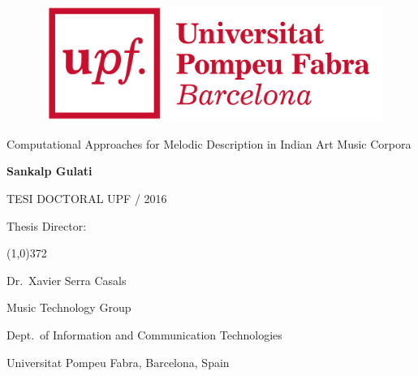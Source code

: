 
\newpage
\thispagestyle{empty}
\begin{titlingpage}
\begin{flushright}

  \begin{figure}[t]
    \begin{flushright}
	\includegraphics[scale=0.08]{ch00/figures/logo_upf_color.png}
    \end{flushright}
  \end{figure}

  \vspace*{2cm} 


  {\linespread{1.1} \huge \textsf{Computational Approaches for Melodic Description in Indian Art Music Corpora} \par}
  
  \vspace*{2.5cm}

  \textbf{\large {Sankalp Gulati}}
  
  \vspace*{\fill} 
  TESI DOCTORAL UPF / 2016

\end{flushright}
  
  \vspace*{2cm}

  Thesis Director:

  \vspace*{-0.25cm}

  \line(1,0){372}
  
  \vspace*{0.25cm}

  Dr.~Xavier Serra Casals
	
  Music Technology Group
  
  Dept.~of Information and Communication Technologies

  Universitat Pompeu Fabra, Barcelona, Spain
  
\end{titlingpage}

